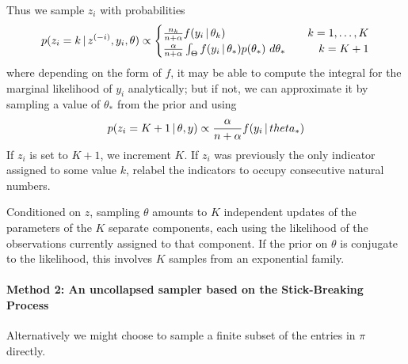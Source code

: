  Thus we sample $z_i$ with probabilities
  \begin{align}
    p(z_i  = k \, \vert \, z^{(-i)}, y_i, \theta) \propto
    \begin{cases}
      \frac{n_k}{n + \alpha} f(y_i \, \vert \, \theta_k) & \quad k = 1,
      \dots, K \\
      \frac{\alpha}{n + \alpha} \int_{\Theta} f(y_i \, \vert \, \theta_*)
      p(\theta_*)\ d\theta_* & \qquad k = K+1
    \end{cases}
  \end{align}
  where depending on the form of $f$, it may be able to compute the
  integral for the marginal likelihood of $y_i$ analytically; but if
  not, we can approximate it by sampling a value of $\theta_*$ from
  the prior and using
  \begin{equation}
    \label{eq:1}
    p(z_i = K + 1 \, \vert \, \theta, y) \propto \frac{\alpha}{n + \alpha} f(y_i \, \vert \, theta_*)
  \end{equation}
  If $z_i$ is set to $K + 1$, we increment $K$.  If $z_i$ was
  previously the only indicator assigned to some value $k$, relabel
  the indicators to occupy consecutive natural numbers.

  Conditioned on $z$, sampling $\theta$ amounts to $K$ independent
  updates of the parameters of the $K$ separate components, each using
  the likelihood of the observations currently assigned to that
  component.  If the prior on $\theta$ is conjugate to the likelihood,
  this involves $K$ samples from an exponential family.

  \paragraph{Method 2: An uncollapsed sampler based on the
    Stick-Breaking Process}

  Alternatively we might choose to sample a finite subset of the
  entries in $\pi$ directly.  

